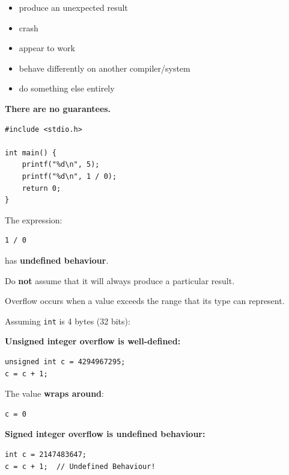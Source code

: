 \documentclass[11pt,a4paper]{article}
\providecommand{\tightlist}{\setlength{\itemsep}{0pt}\setlength{\parskip}{0pt}}
\begin{document}
\begin{itemize}
\tightlist
\item
  produce an unexpected result
\item
  crash
\item
  appear to work
\item
  behave differently on another compiler/system
\item
  do something else entirely
\end{itemize}

\textbf{There are no guarantees.}

\label{example-division-by-zero}
\hypertarget{example-division-by-zero}{}

\begin{lstlisting}[style=cscode]
#include <stdio.h>

int main() {
    printf("%d\n", 5);
    printf("%d\n", 1 / 0);
    return 0;
}
\end{lstlisting}

The expression:

\begin{lstlisting}[style=cscode]
1 / 0
\end{lstlisting}

has \textbf{undefined behaviour}.

Do \textbf{not} assume that it will always produce a particular result.

\label{integer-overflow}
\hypertarget{integer-overflow}{}

Overflow occurs when a value exceeds the range that its type can represent.

Assuming \texttt{int} is 4 bytes (32 bits):

\textbf{Unsigned integer overflow is well-defined:}

\begin{lstlisting}[style=cscode]
unsigned int c = 4294967295;
c = c + 1;
\end{lstlisting}

The value \textbf{wraps around}:

\begin{lstlisting}[style=plaincode]
c = 0
\end{lstlisting}

\textbf{Signed integer overflow is undefined behaviour:}

\begin{lstlisting}[style=cscode]
int c = 2147483647;
c = c + 1;  // Undefined Behaviour!
\end{lstlisting}
\end{document}

